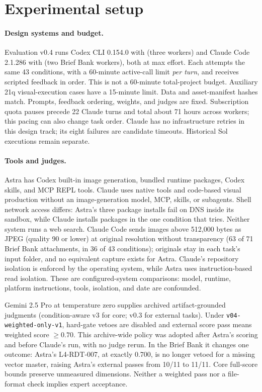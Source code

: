 \section{Experimental setup}
\label{sec:setup}
\paragraph{Design systems and budget.}
Evaluation v0.4 runs Codex CLI 0.154.0 with  (three workers) and Claude Code 2.1.286 with  (two Brief Bank workers), both at max effort. Each attempts the same 43 conditions, with a 60-minute active-call limit \emph{per turn}, and receives scripted feedback in order. This is not a 60-minute total-project budget. Auxiliary 21q visual-execution cases have a 15-minute limit. Data and asset-manifest hashes match. Prompts, feedback ordering, weights, and judges are fixed. Subscription quota pauses precede 22 Claude turns and total about 71 hours across workers; this pacing can also change task order. Claude has no infrastructure retries in this design track; its eight failures are candidate timeouts. Historical Sol executions remain separate.

\paragraph{Tools and judges.}
Astra has Codex built-in image generation, bundled runtime packages, Codex skills, and MCP REPL tools. Claude uses native tools and code-based visual production without an image-generation model, MCP, skills, or subagents. Shell network access differs: Astra's three package installs fail on DNS inside its sandbox, while Claude installs packages in the one condition that tries. Neither system runs a web search. Claude Code sends images above 512,000 bytes as JPEG (quality 90 or lower) at original resolution without transparency (63 of 71 Brief Bank attachments, in 36 of 43 conditions); originals stay in each task's input folder, and no equivalent capture exists for Astra. Claude's repository isolation is enforced by the operating system, while Astra uses instruction-based read isolation. These are configured-system comparisons: model, runtime, platform instructions, tools, isolation, and date are confounded.

Gemini 2.5 Pro at temperature zero supplies archived artifact-grounded judgments (condition-aware v3 for core; v0.3 for external tasks). Under \texttt{v04-weighted-only-v1}, hard-gate vetoes are disabled and external score pass means weighted score $\geq0.70$. This archive-wide policy was adopted after Astra's scoring and before Claude's run, with no judge rerun. In the Brief Bank it changes one outcome: Astra's L4-RDT-007, at exactly 0.700, is no longer vetoed for a missing vector master, raising Astra's external passes from 10/11 to 11/11. Core full-score bounds preserve unmeasured dimensions. Neither a weighted pass nor a file-format check implies expert acceptance.

